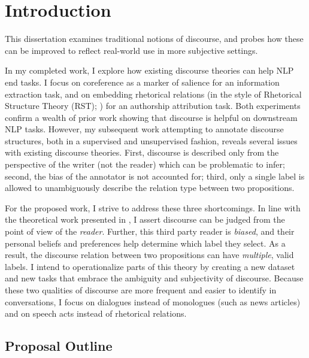 \chapter{Introduction}
\label{ch:intro}

This dissertation examines traditional notions of discourse, and probes how these can be improved to reflect real-world use in more subjective settings. 

In my completed work, I explore how existing discourse theories can help NLP end tasks. I focus on coreference as a marker of salience for an information extraction task, and on embedding rhetorical relations (in the style of Rhetorical Structure Theory (RST); \citet{Mann:1988}) for an authorship attribution task. Both experiments confirm a wealth of prior work showing that discourse is helpful on downstream NLP tasks. However, my subsequent work attempting to annotate discourse structures, both in a supervised and unsupervised fashion, reveals several issues with existing discourse theories. First, discourse is described only from the perspective of the writer (not the reader) which can be problematic to infer; second, the bias of the annotator is not accounted for; third, only a single label is allowed to unambiguously describe the relation type between two propositions. 

For the proposed work, I strive to address these three shortcomings. In line with the theoretical work presented in \citet{Asher:2018}, I assert discourse can be judged from the point of view of the \emph{reader}. Further, this third party reader is \emph{biased}, and their personal beliefs and preferences help determine which label they select. As a result, the discourse relation between two propositions can have \emph{multiple}, valid labels. I intend to operationalize parts of this theory by creating a new dataset and new tasks that embrace the ambiguity and subjectivity of discourse. Because these two qualities of discourse are more frequent and easier to identify in conversations, I focus on dialogues instead of monologues (such as news articles) and on speech acts instead of rhetorical relations.

\section{Proposal Outline}

